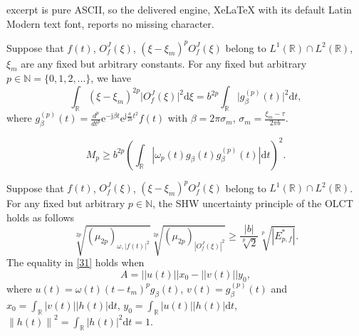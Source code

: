 \documentclass[10pt,a4paper]{amsart}
\begin{document}
excerpt is pure ASCII, so the delivered engine, XeLaTeX with its default Latin Modern text font, reports no missing character.
\begin{thm}
	\label{thm3.1}
	Suppose that $f(t)$, $O_f^J(\xi)$, $(\xi-\xi_m)^p O_f^J(\xi)$ belong to $L^1(\mathbb{R}) \cap L^2(\mathbb{R})$, $\xi_m$ are any fixed but arbitrary constants. For any fixed but arbitrary $p \in \mathbb{N} = \{0,1,2,...\}$, we have
	\begin{equation}
	\label{14}
	\int_{\mathbb{R}} (\xi-\xi_m)^{2p} \lvert O_f^J(\xi) \rvert^2 \mathrm{d} \xi = b^{2p} \int_{\mathbb{R}} \lvert g_\beta^{(p)}(t) \rvert^2 \mathrm{d}t,
	\end{equation}
	where $g_{\beta}^{(p)}(t) = \frac{d^p}{dt^p} \mathrm{e}^{-\mathrm{j} \beta t} \mathrm{e}^{\mathrm{j} \frac{a}{2b} t^2}  f(t)$ with $\beta=2 \pi \sigma_m$, $\sigma_m = \frac{\xi_m-\tau}{2 \pi b}$. %
\end{thm}

\begin{equation}
\label{23}
M_p \ge b^{2p} \left( \int_{\mathbb{R}} \left| \omega_p(t) g_{\beta}(t) g_{\beta}^{(p)} (t) \right| \mathrm{d}t \right)^2.
\end{equation}

\begin{thm}
	\label{thm3.4}
	Suppose that $f(t)$, $O_f^J(\xi)$, $(\xi-\xi_m)^p O_f^J(\xi)$ belong to $L^1(\mathbb{R}) \cap L^2(\mathbb{R})$. For any fixed but arbitrary $p \in \mathbb{N}$, the SHW uncertainty principle of the OLCT holds as follows
	\begin{equation}
	\label{31}
	\sqrt[2p]{(\mu_{2p})_{\omega, \left| f(t) \right|^2}} \sqrt[2p]{(\mu_{2p})_{ \left| O_f^J(\xi) \right|^2}} \ge \frac{|b|}{\sqrt[p]{2}} \sqrt[p]{\left| E_{p,f}^* \right|}.
	\end{equation}
	The equality in \eqref{31} holds when 
	\begin{equation}
	A = ||u(t)||x_0-||v(t)||y_0,
	\end{equation}
	where $u(t) = \omega(t) (t-t_m)^p g_{\beta}(t)$, $v(t) = g_{\beta}^{(p)} (t)$ and $x_0 = \int_{\mathbb{R}} \left|v(t) \right| \left| h(t) \right| \mathrm{d}t$, $y_0 = \int_{\mathbb{R}} \left|u(t) \right| \left| h(t) \right| \mathrm{d}t$, $\left\|h(t)\right\|^2 = \int_{\mathbb{R}} \left|h(t) \right|^2 \mathrm{d}t =1$.
\end{thm}
\end{document}
